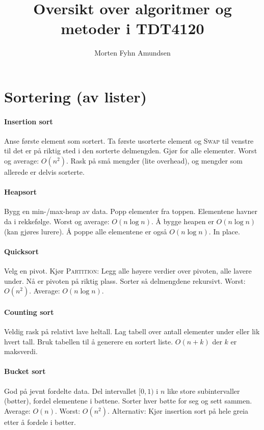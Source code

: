 \documentclass[a4paper]{article}
\title{Oversikt over algoritmer og metoder i TDT4120}
\author{Morten Fyhn Amundsen}
\affil{NTNU}
\begin{document}
\maketitle

\section{Sortering (av lister)}
\paragraph{Insertion sort} Anse første element som sortert. Ta første usorterte element og \textsc{Swap} til venstre til det er på riktig sted i den sorterte delmengden. Gjør for alle elementer. Worst og average: $O(n^2)$. Rask på små mengder (lite overhead), og mengder som allerede er delvis sorterte.
\paragraph{Heapsort} Bygg en min-/max-heap av data. Popp elementer fra toppen. Elementene havner da i rekkefølge. Worst og average: $O(n \log n).$ Å bygge heapen er $O(n \log n)$ (kan gjøres lurere). Å poppe alle elementene er også $O(n \log n)$. In place.
\paragraph{Quicksort} Velg en pivot. Kjør \textsc{Partition}: Legg alle høyere verdier over pivoten, alle lavere under. Nå er pivoten på riktig plass. Sorter så delmengdene rekursivt. Worst: $O(n^2)$. Average: $O(n \log n)$.
\paragraph{Counting sort} Veldig rask på relativt lave heltall. Lag tabell over antall elementer under eller lik hvert tall. Bruk tabellen til å generere en sortert liste. $O(n+k)$ der $k$ er maksverdi.
\paragraph{Bucket sort} God på jevnt fordelte data. Del intervallet $[0, 1)$ i $n$ like store subintervaller (bøtter), fordel elementene i bøttene. Sorter hver bøtte for seg og sett sammen. Average: $O(n)$. Worst: $O(n^2)$. Alternativ: Kjør insertion sort på hele greia etter å fordele i bøtter.
\end{document}
